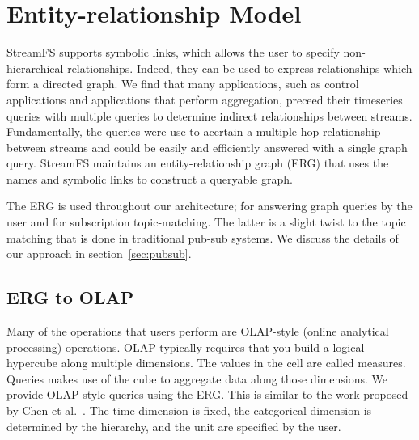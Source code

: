 


\section{Entity-relationship Model}

StreamFS supports symbolic links, which allows the user to specify non-hierarchical relationships.  Indeed, they can 
be used to express relationships which form a directed graph.  We find that many applications, such as control 
applications and applications that perform aggregation, preceed their timeseries queries with multiple queries
to determine indirect relationships between streams.  Fundamentally, the queries were use to acertain a multiple-hop
relationship between streams and could be easily and efficiently answered with a single graph query.
StreamFS maintains an entity-relationship graph (ERG) that uses the names and symbolic links to construct a queryable 
graph.

The ERG is used throughout our architecture; for answering graph queries by the user and for subscription topic-matching.
The latter is a slight twist to the topic matching that is done in traditional pub-sub systems.
We discuss the details of our approach in section~\ref{sec:pubsub}.


\subsection{ERG to OLAP}
\label{sec:erg2olap}

Many of the operations that users perform are OLAP-style (online analytical processing) operations\cite{Gray1996}. 
OLAP typically requires that you build a logical hypercube along multiple dimensions.  The values in the cell are called 
measures.  Queries makes use of the cube to aggregate data along those dimensions.
We provide OLAP-style queries using the ERG.  This is similar to the work proposed by Chen et al.~\cite{Chen2008_olapgraph}.
The time dimension is fixed, the categorical dimension is determined by the hierarchy, and the unit are specified
by the user.

